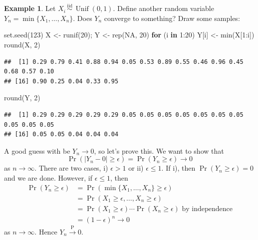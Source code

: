 \documentclass[
]{book}
\newenvironment{Shaded}{\begin{snugshade}}{\end{snugshade}}
\newcommand{\ConstantTok}[1]{\textcolor[rgb]{0.00,0.00,0.00}{#1}}
\newcommand{\ControlFlowTok}[1]{\textcolor[rgb]{0.13,0.29,0.53}{\textbf{#1}}}
\newcommand{\DecValTok}[1]{\textcolor[rgb]{0.00,0.00,0.81}{#1}}
\newcommand{\FunctionTok}[1]{\textcolor[rgb]{0.00,0.00,0.00}{#1}}
\newcommand{\NormalTok}[1]{#1}
\newcommand{\OtherTok}[1]{\textcolor[rgb]{0.56,0.35,0.01}{#1}}
\newcommand{\SpecialCharTok}[1]{\textcolor[rgb]{0.00,0.00,0.00}{#1}}
\DeclareMathOperator{\Unif}{Unif}
\newcommand{\iid}{\,\overset{\text{iid}}{\sim}\,}
\theoremstyle{definition}
\theoremstyle{definition}
\newtheorem{example}{Example}[chapter]
\theoremstyle{definition}
\theoremstyle{definition}
\theoremstyle{remark}
\begin{document}
\begin{example}
Let \(X_i\iid \Unif(0,1)\). Define another random variable \(Y_n=\min\{X_1,\dots,X_n\}\). Does \(Y_n\) converge to something? Draw some samples:

\begin{Shaded}
\begin{Highlighting}[]
\FunctionTok{set.seed}\NormalTok{(}\DecValTok{123}\NormalTok{)}
\NormalTok{X }\OtherTok{\textless{}{-}} \FunctionTok{runif}\NormalTok{(}\DecValTok{20}\NormalTok{); Y }\OtherTok{\textless{}{-}} \FunctionTok{rep}\NormalTok{(}\ConstantTok{NA}\NormalTok{, }\DecValTok{20}\NormalTok{)}
\ControlFlowTok{for}\NormalTok{ (i }\ControlFlowTok{in} \DecValTok{1}\SpecialCharTok{:}\DecValTok{20}\NormalTok{) Y[i] }\OtherTok{\textless{}{-}} \FunctionTok{min}\NormalTok{(X[}\DecValTok{1}\SpecialCharTok{:}\NormalTok{i]) }
\FunctionTok{round}\NormalTok{(X, }\DecValTok{2}\NormalTok{)}
\end{Highlighting}
\end{Shaded}

\begin{verbatim}
##  [1] 0.29 0.79 0.41 0.88 0.94 0.05 0.53 0.89 0.55 0.46 0.96 0.45 0.68 0.57 0.10
## [16] 0.90 0.25 0.04 0.33 0.95
\end{verbatim}

\begin{Shaded}
\begin{Highlighting}[]
\FunctionTok{round}\NormalTok{(Y, }\DecValTok{2}\NormalTok{)}
\end{Highlighting}
\end{Shaded}

\begin{verbatim}
##  [1] 0.29 0.29 0.29 0.29 0.29 0.05 0.05 0.05 0.05 0.05 0.05 0.05 0.05 0.05 0.05
## [16] 0.05 0.05 0.04 0.04 0.04
\end{verbatim}

A good guess with be \(Y_n \to 0\), so let's prove this.
We want to show that
\[\Pr(|Y_n-0| \geq \epsilon)=\Pr(Y_n\geq \epsilon)\to 0\]
as \(n\to \infty\). There are two cases, i) \(\epsilon > 1\) or ii) \(\epsilon \leq 1\). If i), then \(\Pr(Y_n\geq \epsilon)=0\) and we are done. However, if \(\epsilon \leq 1\), then
\[
\begin{aligned}
\Pr(Y_n\geq \epsilon) 
&= \Pr(\min\{X_1,\dots,X_n\} \geq \epsilon) \\
&=\Pr(X_1 \geq \epsilon, \dots, X_n \geq \epsilon) \\
&=\Pr(X_1\geq \epsilon)\cdots \Pr(X_n\geq \epsilon) \text{ by independence}\\
&=(1-\epsilon)^n \to 0
\end{aligned}
\]
as \(n\to \infty\). Hence \(Y_n \xrightarrow{\text{P}} 0\).
\end{example}
\end{document}
